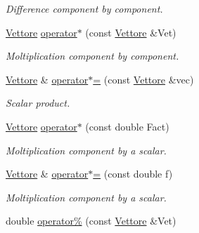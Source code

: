 \begin{DoxyCompactItemize}
\begin{DoxyCompactList}\small\item\em Difference component by component. \end{DoxyCompactList}\item 
\hyperlink{classVettore}{Vettore} \hyperlink{classVettore_a00320cfea95d8047e4da795752c6fa86}{operator$\ast$} (const \hyperlink{classVettore}{Vettore} \&Vet)\hypertarget{classVettore_a00320cfea95d8047e4da795752c6fa86}{}\label{classVettore_a00320cfea95d8047e4da795752c6fa86}

\begin{DoxyCompactList}\small\item\em Moltiplication component by component. \end{DoxyCompactList}\item 
\hyperlink{classVettore}{Vettore} \& \hyperlink{classVettore_a77cef992de9faca80d4793e49fbca308}{operator$\ast$=} (const \hyperlink{classVettore}{Vettore} \&vec)\hypertarget{classVettore_a77cef992de9faca80d4793e49fbca308}{}\label{classVettore_a77cef992de9faca80d4793e49fbca308}

\begin{DoxyCompactList}\small\item\em Scalar product. \end{DoxyCompactList}\item 
\hyperlink{classVettore}{Vettore} \hyperlink{classVettore_abfb6a64e5e1a2d892a7ec95aeaf87a50}{operator$\ast$} (const double Fact)\hypertarget{classVettore_abfb6a64e5e1a2d892a7ec95aeaf87a50}{}\label{classVettore_abfb6a64e5e1a2d892a7ec95aeaf87a50}

\begin{DoxyCompactList}\small\item\em Moltiplication component by a scalar. \end{DoxyCompactList}\item 
\hyperlink{classVettore}{Vettore} \& \hyperlink{classVettore_a7f8dc90bb200d3eddb0e06df2bed55ac}{operator$\ast$=} (const double f)\hypertarget{classVettore_a7f8dc90bb200d3eddb0e06df2bed55ac}{}\label{classVettore_a7f8dc90bb200d3eddb0e06df2bed55ac}

\begin{DoxyCompactList}\small\item\em Moltiplication component by a scalar. \end{DoxyCompactList}\item 
double \hyperlink{classVettore_ac3246db90b8c4d550de3eab05f179509}{operator\%} (const \hyperlink{classVettore}{Vettore} \&Vet)\hypertarget{classVettore_ac3246db90b8c4d550de3eab05f179509}{}\label{classVettore_ac3246db90b8c4d550de3eab05f179509}


\end{DoxyCompactItemize}
